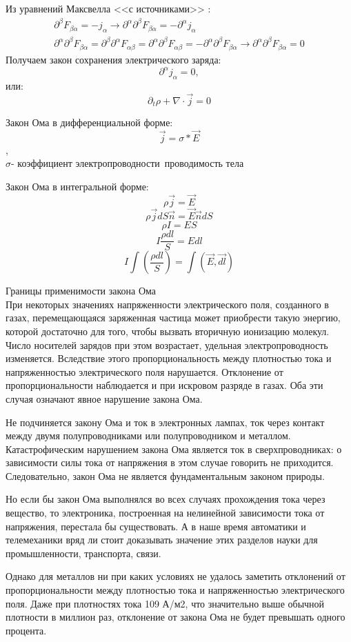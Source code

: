 \documentclass[__main__.tex]{subfiles}
\begin{document}
Из уравнений Максвелла <<с источниками>> :
\begin{gather*}
	\partial^\beta F_{\beta\alpha} = -j_\alpha \longrightarrow \partial^\alpha\partial^\beta F_{\beta\alpha} = -\partial^\alpha j_\alpha\\
	\partial^\alpha\partial^\beta F_{\beta\alpha} = \partial^\beta\partial^\alpha F_{\alpha\beta} = \partial^\alpha\partial^\beta F_{\alpha\beta} = - \partial^\alpha\partial^\beta F_{\beta\alpha} \longrightarrow \partial^\alpha\partial^\beta F_{\beta\alpha} = 0
\end{gather*}
Получаем закон сохранения электрического заряда:
$$\partial^\alpha j_\alpha = 0,$$
или:
$$\partial_t\rho + \nabla \cdot \vec j = 0$$

\begin{definition}
	Закон Ома в дифференциальной форме:
	$$\vec{j}=σ*\vec{E}$$,
	\\$σ$- коэффициент электропроводности\ проводимость тела
\end{definition}
\begin{definition}
	Закон Ома в интегральной форме:
	$$ρ\vec{j}=\vec{E}$$
	$$ρ\vec{j}dS\vec{n}=\vec{E}\vec{n}dS$$
	$$ρI=ES$$
	$$I\frac{ρdl}{S}=Edl$$
	$$I\int(\frac{ρdl}{S})=\int(\vec{E},\vec{dl})$$
\end{definition}
Границы применимости закона Ома\\

При некоторых значениях напряженности электрического поля, созданного в газах, перемещающаяся заряженная частица может приобрести такую энергию, которой достаточно для того, чтобы вызвать вторичную ионизацию молекул. Число носителей зарядов при этом возрастает, удельная электропроводность изменяется. Вследствие этого пропорциональность между плотностью тока и напряженностью электрического поля нарушается. Отклонение от пропорциональности наблюдается и при искровом разряде в газах. Оба эти случая означают явное нарушение закона Ома.

Не подчиняется закону Ома и ток в электронных лампах, ток через контакт между двумя полупроводниками или полупроводником и металлом. Катастрофическим нарушением закона Ома является ток в сверхпроводниках: о зависимости силы тока от напряжения в этом случае говорить не приходится. Следовательно, закон Ома не является фундаментальным законом природы.

Но если бы закон Ома выполнялся во всех случаях прохождения тока через вещество, то электроника, построенная на нелинейной зависимости тока от напряжения, перестала бы существовать. А в наше время автоматики и телемеханики вряд ли стоит доказывать значение этих разделов науки для промышленности, транспорта, связи.

Однако для металлов ни при каких условиях не удалось заметить отклонений от пропорциональности между плотностью тока и напряженностью электрического поля. Даже при плотностях тока 109 А/м2, что значительно выше обычной плотности в миллион раз, отклонение от закона Ома не будет превышать одного процента.
\end{document}
